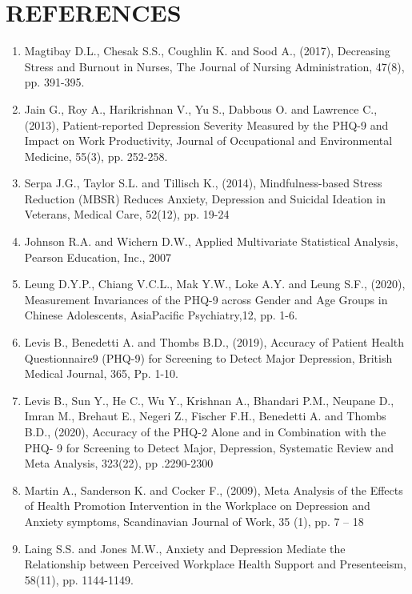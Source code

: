 \documentclass[12pt]{article}
\begin{document}
\section*{REFERENCES}
\begin{enumerate}
\item Magtibay D.L., Chesak S.S., Coughlin K. and Sood A., (2017), Decreasing Stress and Burnout in Nurses, The Journal of Nursing Administration, 47(8), pp. 391-395.

\item Jain G., Roy A., Harikrishnan V., Yu S., Dabbous O. and Lawrence C., (2013), Patient-reported Depression Severity Measured by the PHQ-9 and Impact on Work Productivity, Journal of Occupational and Environmental Medicine, 55(3), pp. 252-258.

\item Serpa J.G., Taylor S.L. and Tillisch K., (2014), Mindfulness-based Stress Reduction (MBSR) Reduces Anxiety, Depression and Suicidal Ideation in Veterans, Medical Care, 52(12), pp. 19-24

\item Johnson R.A. and Wichern D.W., Applied Multivariate Statistical Analysis, Pearson Education, Inc., 2007

\item Leung D.Y.P., Chiang V.C.L., Mak Y.W., Loke A.Y. and Leung S.F., (2020), Measurement Invariances of the PHQ-9 across Gender and Age Groups in Chinese Adolescents, AsiaPacific Psychiatry,12, pp. 1-6.

\item Levis B., Benedetti A. and Thombs B.D., (2019), Accuracy of Patient Health Questionnaire9 (PHQ-9) for Screening to Detect Major Depression, British Medical Journal, 365, Pp. 1-10. 

\item Levis B., Sun Y., He C., Wu Y., Krishnan A., Bhandari P.M., Neupane D., Imran M., Brehaut E., Negeri Z., Fischer F.H., Benedetti A. and Thombs B.D., (2020), Accuracy of the PHQ-2 Alone and in Combination with the PHQ- 9 for Screening to Detect Major, Depression, Systematic Review and Meta Analysis, 323(22), pp .2290-2300 

\item Martin A., Sanderson K. and Cocker F., (2009), Meta Analysis of the Effects of Health Promotion Intervention in the Workplace on Depression and Anxiety symptoms, Scandinavian Journal of Work, 35 (1), pp. 7 – 18

\item Laing S.S. and Jones M.W., Anxiety and Depression Mediate the Relationship between Perceived Workplace Health Support and Presenteeism, 58(11), pp. 1144-1149.

\end{enumerate}
\end{document}
